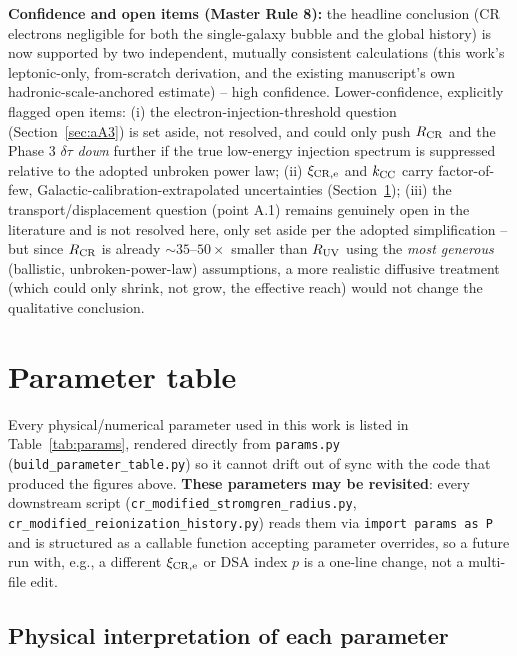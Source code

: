 \documentclass[11pt,a4paper]{article}
\begin{document}
\textbf{Confidence and open items (Master Rule 8):} the headline conclusion (CR electrons
negligible for both the single-galaxy bubble and the global history) is now supported by two
independent, mutually consistent calculations (this work's leptonic-only, from-scratch
derivation, and the existing manuscript's own hadronic-scale-anchored estimate) -- high
confidence. Lower-confidence, explicitly flagged open items: (i) the electron-injection-threshold
question (Section~\ref{sec:aA3}) is set aside, not resolved, and could only push $R_{\rm CR}$
and the Phase 3 $\delta\tau$ \emph{down} further if the true low-energy injection spectrum is
suppressed relative to the adopted unbroken power law; (ii) $\xi_{\rm CR,e}$ and $k_{\rm CC}$
carry factor-of-few, Galactic-calibration-extrapolated uncertainties (Section~\ref{sec:paramtable});
(iii) the transport/displacement question (point A.1) remains genuinely open in the
literature and is not resolved here, only set aside per the adopted simplification -- but
since $R_{\rm CR}$ is already $\sim35$--$50\times$ smaller than $R_{\rm UV}$ using the
\emph{most generous} (ballistic, unbroken-power-law) assumptions, a more realistic diffusive
treatment (which could only shrink, not grow, the effective reach) would not change the
qualitative conclusion.

\section{Parameter table}
\label{sec:paramtable}

Every physical/numerical parameter used in this work is listed in
Table~\ref{tab:params}, rendered directly from \texttt{params.py}
(\texttt{build\_parameter\_table.py}) so it cannot drift out of sync with the code that
produced the figures above. \textbf{These parameters may be revisited}: every downstream
script (\texttt{cr\_modified\_stromgren\_radius.py}, \texttt{cr\_modified\_reionization\_history.py})
reads them via \texttt{import params as P} and is structured as a callable function accepting
parameter overrides, so a future run with, e.g., a different $\xi_{\rm CR,e}$ or DSA index $p$
is a one-line change, not a multi-file edit.



\subsection{Physical interpretation of each parameter}
\label{sec:paraminterp}
\end{document}
